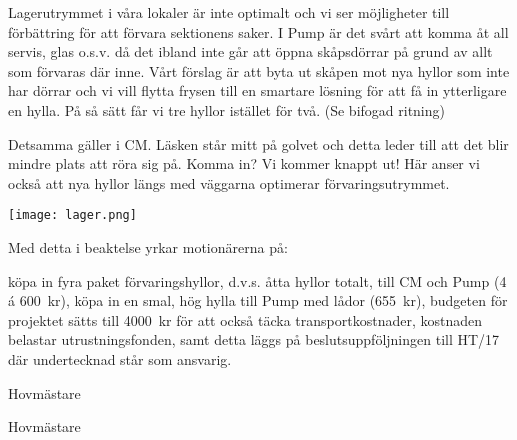 \documentclass[../_main/handlingar.tex]{subfiles}
\begin{document}

Lagerutrymmet i våra lokaler är inte optimalt och vi ser möjligheter till förbättring för att förvara sektionens saker. I Pump är det svårt att komma åt all servis, glas o.s.v. då det ibland inte går att öppna skåpsdörrar på grund av allt som förvaras där inne. Vårt förslag är att byta ut skåpen mot nya hyllor som inte har dörrar och vi vill flytta frysen till en smartare lösning för att få in ytterligare en hylla. På så sätt får vi tre hyllor istället för två. (Se bifogad ritning)

Detsamma gäller i CM. Läsken står mitt på golvet och detta leder till att det blir mindre plats att röra sig på. Komma in? Vi kommer knappt ut! Här anser vi också att nya hyllor längs med väggarna optimerar förvaringsutrymmet.

\begin{center}
\texttt{[image: lager.png]}
\end{center}

Med detta i beaktelse yrkar motionärerna på:
\begin{attsatser}
    \att köpa in fyra paket förvaringshyllor, d.v.s. åtta hyllor totalt, till CM och Pump (4 á \SI{600}{kr}),
    \att köpa in en smal, hög hylla till Pump med lådor (\SI{655}{kr}),
    \att budgeten för projektet sätts till \SI{4000}{kr} för att också täcka transportkostnader,
    \att kostnaden belastar utrustningsfonden, samt
    \att detta läggs på beslutsuppföljningen till HT/17 där undertecknad står som ansvarig.
\end{attsatser}

\begin{signatures}{2}
    \mvh
    \signature{Sanna Nordberg}{Hovmästare}
    \signature{Matilda Dahlström}{Hovmästare}
\end{signatures}
\end{document}
